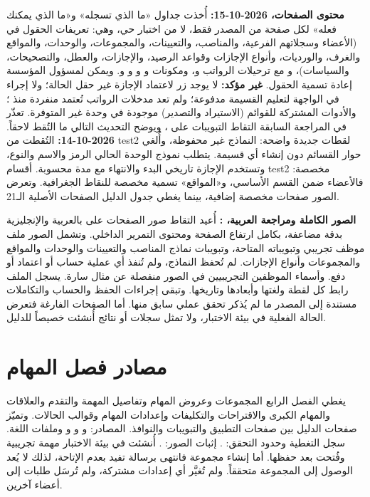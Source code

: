 \textbf{محتوى الصفحات، 2026-10-15:} أُخذت جداول «ما الذي تسجله» و«ما الذي يمكنك فعله» لكل صفحة من المصدر فقط، لا من اختبار حي، وهي: تعريفات الحقول في  (الأعضاء وسجلاتهم الفرعية، والمناصب، والتعيينات، والمجموعات، والوحدات، والمواقع والغرف، والورديات، وأنواع الإجازات وقواعد الرصيد، والإجازات، والعطل، والتصحيحات، والسياسات)، و مع ترحيلات الرواتب  و، ومكونات  و و و و. ويمكن لمسؤول المؤسسة إعادة تسمية الحقول. \textbf{غير مؤكد:} لا يوجد زر لاعتماد الإجازة غير حقل الحالة؛ ولا إجراء في الواجهة لتعليم القسيمة مدفوعة؛ ولم تعد مدخلات الرواتب تُعتمد منفردة منذ ؛ والأدوات المشتركة للقوائم (الاستيراد والتصدير) موجودة في وحدة  غير المتوفرة. تعذّر في المراجعة السابقة التقاط التبويبات على ، ويوضح التحديث التالي ما التُقط لاحقاً.
\textbf{2026-10-14:} التُقطت من test2 لقطات جديدة واضحة: النماذج غير محفوظة، وأُلغي حوار القسائم دون إنشاء أي قسيمة. يتطلب نموذج الوحدة الحالي الرمز والاسم والنوع، وتستخدم الإجازة تاريخي البدء والانتهاء مع مدة محسوبة. أقسام test2 مخصصة: فالأعضاء ضمن القسم الأساسي، و«المواقع» تسمية مخصصة للنقاط الجغرافية. وتعرض الصور صفحات مخصصة إضافية، بينما يغطي جدول الدليل الصفحات الأصلية الـ21.


\textbf{الصور الكاملة ومراجعة العربية، :} أُعيد التقاط صور الصفحات على  بالعربية والإنجليزية بدقة مضاعفة، بكامل ارتفاع الصفحة ومحتوى التمرير الداخلي. وتشمل الصور ملف موظف تجريبي وتبويباته المتاحة، وتبويبات نماذج المناصب والتعيينات والوحدات والمواقع والمجموعات وأنواع الإجازات. لم تُحفظ النماذج، ولم تُنفذ أي عملية حساب أو اعتماد أو دفع. وأسماء الموظفين التجريبيين في الصور منفصلة عن مثال سارة. يسجل الملف  رابط كل لقطة ولغتها وأبعادها وتاريخها. وتبقى إجراءات الحفظ والحساب والتكاملات مستندة إلى المصدر ما لم يُذكر تحقق عملي سابق منها. أما الصفحات الفارغة فتعرض الحالة الفعلية في بيئة الاختبار، ولا تمثل سجلات أو نتائج أُنشئت خصيصاً للدليل.


\section{مصادر فصل المهام}
\label{sec:sources-tasks}
يغطي الفصل الرابع المجموعات وعروض المهام وتفاصيل المهمة والتقدم والعلاقات والمهام الكبرى والاقتراحات والتكليفات وإعدادات المهام وقوالب الحالات. وتميّز صفحات الدليل بين صفحات التطبيق والتبويبات والنوافذ.
المصادر:  و و و وملفات اللغة. سجل التغطية وحدود التحقق: . إثبات الصور: .
أُنشئت في بيئة الاختبار مهمة تجريبية وفُتحت بعد حفظها. أما إنشاء مجموعة فانتهى برسالة تفيد بعدم الإتاحة، لذلك لا يُعد الوصول إلى المجموعة متحققاً. ولم تُغيَّر أي إعدادات مشتركة، ولم تُرسَل طلبات إلى أعضاء آخرين.

